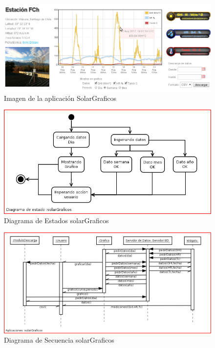 \begin{figure}[h!]
        \centering
        \includegraphics[scale=0.35]{images/solarGrafico}
        \caption{Imagen de la aplicación SolarGraficos}
        \label{solarGraficoFoto1}
\end{figure}

\begin{figure}[h!]
        \centering
        \includegraphics[scale=0.6]{images/graficosEstados}
        \caption{Diagrama de Estados solarGraficos}
        \label{solarGraficoE}
\end{figure}

\begin{figure}[h!]
        \centering
        \includegraphics[scale=0.4]{images/graficosSecuencia}
        \caption{Diagrama de Secuencia solarGraficos}
        \label{solarGraficoS}
\end{figure}


